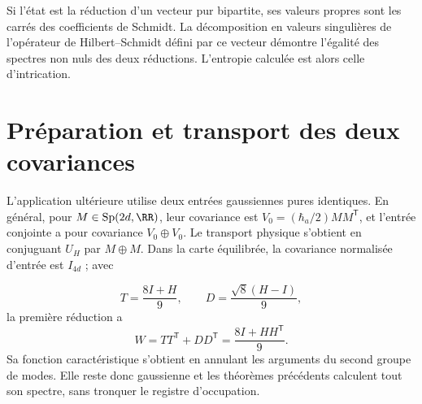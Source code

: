 Si l’état est la réduction d’un vecteur pur bipartite, ses
valeurs propres sont les carrés des coefficients de Schmidt.
La décomposition en valeurs singulières de l’opérateur de Hilbert--Schmidt défini
par ce vecteur démontre l’égalité des spectres non nuls des deux
réductions. L’entropie calculée est alors celle d’intrication.

\section{Préparation et transport des deux covariances}
L’application ultérieure utilise deux entrées gaussiennes pures identiques.
En général, pour \(M\in\operatorname{Sp}(2d,\RR)\), leur covariance est
\(V_0=(\hbar_a/2)MM^{\mathsf T}\), et l’entrée conjointe a pour
covariance \(V_0\oplus V_0\). Le transport physique s’obtient
en conjuguant \(U_H\) par \(M\oplus M\). Dans la carte équilibrée,
la covariance normalisée d’entrée est \(I_{4d}\) ; avec

\[
 T=\frac{8I+H}{9},\qquad D=\frac{\sqrt8(H-I)}9,
\]
la première réduction a
\[
 W=TT^{\mathsf T}+DD^{\mathsf T}=\frac{8I+HH^{\mathsf T}}9.
\]
Sa fonction caractéristique s’obtient en annulant les arguments du
second groupe de modes. Elle reste donc gaussienne et les théorèmes
précédents calculent tout son spectre, sans tronquer le registre d’occupation.
